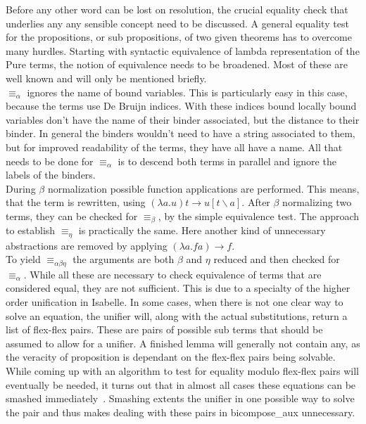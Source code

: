 Before any other word can be lost on resolution, the crucial equality check that underlies any any sensible concept need to be discussed. A general equality test for the propositions, or sub propositions, of two given theorems has to overcome many hurdles. Starting with syntactic equivalence of lambda representation of the Pure terms, the notion of equivalence needs to be broadened. Most of these are well known and will only be mentioned briefly.\\
$\equiv_\alpha$ ignores the name of bound variables. This is particularly easy in this case, because the terms use De Bruijn indices. With these indices bound locally bound variables don't have the name of their binder associated, but the distance to their binder. In general the binders wouldn't need to have a string associated to them, but for improved readability of the terms, they have all have a name. All that needs to be done for $\equiv_\alpha$ is to descend both terms in parallel and ignore the labels of the binders.\\
During $\beta$ normalization possible function applications are performed. This means, that the term is rewritten, using $(\lambda a.u) t \rightarrow u[t \backslash a]$. After $\beta$ normalizing two terms, they can be checked for $\equiv_\beta$, by the simple equivalence test. The approach to establish $\equiv_\eta$ is practically the same. Here another kind of unnecessary abstractions are removed by applying $(\lambda a.f a) \rightarrow f$.\\
To yield $\equiv_{\alpha\beta\eta}$ the arguments are both $\beta$ and $\eta$ reduced and then checked for $\equiv_\alpha$. While all these are necessary to check equivalence of terms that are considered equal, they are not sufficient. This is due to a specialty of the higher order unification in Isabelle. In some cases, when there is not one clear way to solve an equation, the unifier will, along with the actual substitutions, return a list of flex-flex pairs. These are pairs of possible sub terms that should be assumed to allow for a unifier. A finished lemma will generally not contain any, as the veracity of proposition is dependant on the flex-flex pairs being solvable.\\
While coming up with an algorithm to test for equality modulo flex-flex pairs will eventually be needed, it turns out that in almost all cases these equations can be smashed immediately~\parencite{Wimmer2016}. Smashing extents the unifier in one possible way to solve the pair and thus makes dealing with these pairs in bicompose\_aux unnecessary.

